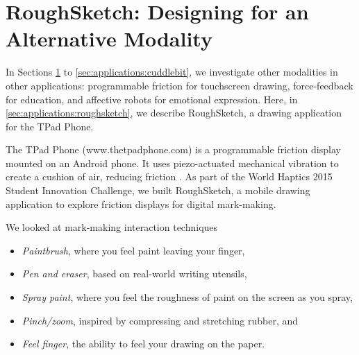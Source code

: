 \section{RoughSketch: Designing for an Alternative Modality}
\label{sec:applications:roughsketch}

In Sections \ref{sec:applications:roughsketch} to \ref{sec:applications:cuddlebit}, we investigate other modalities in other applications: programmable friction for touchscreen drawing, force-feedback for education, and affective robots for emotional expression.
Here, in \autoref{sec:applications:roughsketch}, we describe RoughSketch, a drawing application for the TPad Phone.

The TPad Phone (www.thetpadphone.com) is a programmable friction display mounted on an Android phone.
It uses piezo-actuated mechanical vibration to create a cushion of air, reducing friction \cite{Winfield2007}.
As part of the World Haptics 2015 Student Innovation Challenge, we built RoughSketch, a mobile drawing application to explore friction displays for digital mark-making.


We looked at  mark-making interaction techniques\revFinalAgain{:}
\begin{itemize}
    \item \textit{Paintbrush}, where you feel paint leaving your finger,
    \item \textit{Pen and eraser}, based on real-world writing utensils,
    \item \textit{Spray paint}, where you feel the roughness of paint on the screen as you spray,
    \item \textit{Pinch/zoom}, inspired by compressing and stretching rubber, and
    \item \textit{Feel finger}, the ability to feel your drawing on the paper.
\end{itemize}

